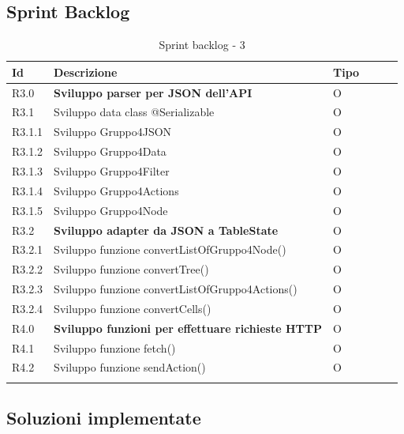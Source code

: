 \subsection{Sprint Backlog}
\begin{longtable} {
		|>{}p{10mm}| 
		|>{}p{90mm}|
		|>{}p{15mm}|
		|>{}p{15mm}|
		|>{}p{15mm}|
		>{}p{0mm}}
	\hline
	\textbf{Id} & \textbf{Descrizione} & \textbf{Tipo} \\ \hline
	R3.0   & \textbf{Sviluppo parser per JSON dell'API}         & O\\ \hline
	R3.1   & Sviluppo data class @Serializable 	   & O\\ \hline
	R3.1.1 & Sviluppo Gruppo4JSON & O\\ \hline
	R3.1.2 & Sviluppo Gruppo4Data & O\\ \hline
	R3.1.3 & Sviluppo Gruppo4Filter & O\\ \hline
	R3.1.4 & Sviluppo Gruppo4Actions & O\\ \hline
	R3.1.5 & Sviluppo Gruppo4Node & O\\ \hline
	R3.2   & \textbf{Sviluppo adapter da JSON a TableState} & O\\ \hline
	R3.2.1   & Sviluppo funzione convertListOfGruppo4Node() & O\\ \hline
	R3.2.2   & Sviluppo funzione convertTree() & O \\ \hline
	R3.2.3   & Sviluppo funzione convertListOfGruppo4Actions() & O\\ \hline
	R3.2.4   & Sviluppo funzione convertCells() & O\\ \hline
	
	R4.0 & \textbf{Sviluppo funzioni per effettuare richieste HTTP}  & O    \\ \hline
	R4.1   & Sviluppo funzione fetch() & O     \\ \hline
	R4.2   & Sviluppo funzione sendAction() & O    \\ \hline
	\caption{Sprint backlog - 3}
\end{longtable}

\subsection{Soluzioni implementate}

